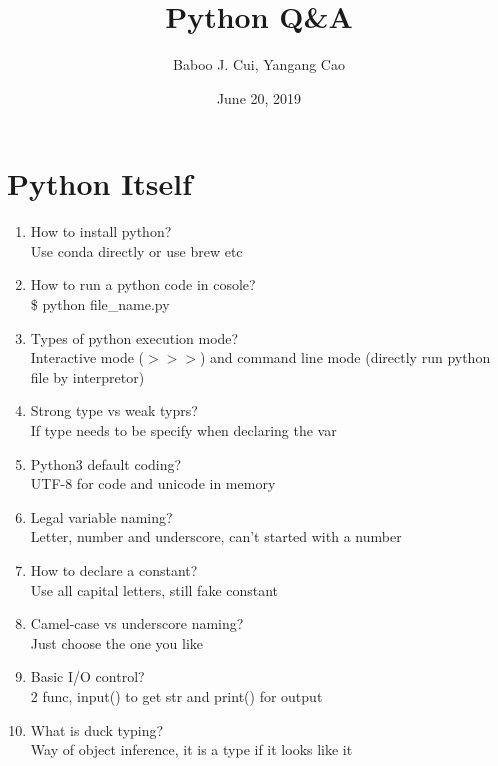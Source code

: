 \documentclass[10pt,a4paper,oneside]{article}
\date{June 20, 2019}
\author{Baboo J. Cui, Yangang Cao}
\title{Python Q\&A}
\begin{document}
\maketitle
\tableofcontents

\newpage

\section{Python Itself}
\begin{enumerate}[1.]
\item How to install python?\\
Use conda directly or use brew etc
\item How to run a python code in cosole?\\
\$ python file\_name.py
\item Types of python execution mode?\\
Interactive mode ($>>>$) and command line mode (directly run python file by interpretor)
\item Strong type vs weak typrs?\\
If type needs to be specify when declaring the var
\item Python3 default coding?\\
UTF-8 for code and unicode in memory
\item Legal variable naming?\\
Letter, number and underscore, can't started with a number
\item How to declare a constant?\\
Use all capital letters, still fake constant
\item Camel-case vs underscore naming?\\
Just choose the one you like
\item Basic I/O control?\\
2 func, input() to get str and print() for output
\item What is duck typing?\\
Way of object inference, it is a type if it looks like it
\end{enumerate}
\end{document}
